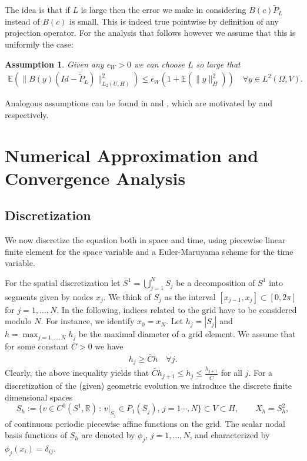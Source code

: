 \documentclass[a4paper,10pt]{article}
\newtheorem{ass}[cor]{Assumption}
\newcommand{\R}{\mathbb{R}}
\def\proj{\tilde{P}}
\numberwithin{equation}{section}
\begin{document}
The idea is that if $L$ is large then the error we make in considering $B(c) \proj_{L}$ instead of $B(c)$ is small. This is indeed true pointwise by definition of any projection operator. For the analysis that follows however we assume that this is uniformly the case:

\begin{ass}\label{approximW}
Given any $\epsilon_{W}>0$ we can choose $L$ so large that
\begin{align*} 
 \mathbb{E}(\|B(y) (Id - \proj_{L})\|^{2}_{L_{2}(U,H)}) \leq \epsilon_{W} (1+ \mathbb{E}(\| y \|^{2}_{H})) \quad \forall y \in L^{2}(\Omega,V).
\end{align*}
\end{ass}

Analogous assumptions can be found in \cite[Assumption~10.32]{Powell} and \cite[(H4) in \S4.3]{BDE}, which are motivated by \cite[Lemma 10.33]{Powell} and \cite[remark 4.3]{BDE} respectively.


\section{Numerical Approximation and Convergence Analysis}

\subsection{Discretization}

We now discretize the equation both in space and time, using piecewise linear finite element for the space variable and a Euler-Maruyama scheme for the time variable.

For the spatial discretization let $S^1= \bigcup_{j=1}^N S_j$ be a decomposition of $S^1$ into segments given by nodes $x_j$. We think of $S_j$ as the interval $[x_{j-1}, x_{j}] \subset [0,2\pi]$ for $j=1, \ldots, N$. In the following, indices related to the grid have to be considered modulo $N$. For instance, we identify $x_0=x_N$. Let $h_j=|S_j|$ and $h=\max_{j=1,\ldots, N}h_j$ be the maximal diameter of a grid element. We assume that for some constant $\bar{C}>0$ we have
\begin{align}
\label{(4.1)}
h_j \geq \bar{C}h \quad \forall j.
\end{align}
Clearly, the above inequality yields that $\bar{C}h_{j+1} \leq h_j \leq \frac{h_{j+1}}{\bar{C}}$ for all $j$.
For a discretization of the (given) geometric evolution we introduce the discrete finite dimensional spaces
\begin{equation*}
S_h := \{ v \in C^0(S^1, \R) \, : \, v|_{S_j} \in P_1 (S_j),\, j=1 \cdots, N\} \subset V \subset H, \qquad X_h = S_h^2,
\end{equation*}
of continuous periodic piecewise affine functions on the grid. The scalar nodal basis functions of $S_h$ are denoted by $\phi_j$, $j=1, \ldots, N$, and characterized by $\phi_j(x_i)=\delta_{ij}$.
\end{document}
